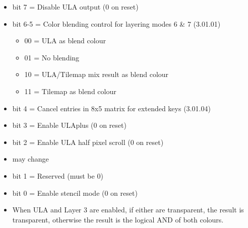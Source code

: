 \begin{itemize}
\item bit 7 = Disable ULA output (0 on reset)
\item bit 6-5 = Color blending control for layering modes 6 \& 7 (3.01.01)
\begin{itemize}
\item 00 = ULA as blend colour
\item 01 = No blending
\item 10 = ULA/Tilemap mix result as blend colour
\item 11 = Tilemap as blend colour
\end{itemize}
\item bit 4 = Cancel entries in 8x5 matrix for extended keys (3.01.04)
\item bit 3 = Enable ULAplus (0 on reset)
\item bit 2 = Enable ULA half pixel scroll (0 on reset)
\item[] may change
\item bit 1 = Reserved (must be 0)
\item bit 0 = Enable stencil mode (0 on reset)
\item[] When ULA and Layer 3 are enabled, if either are transparent,
  the result is transparent, otherwise the result is the logical AND
  of both colours.
\end{itemize}

